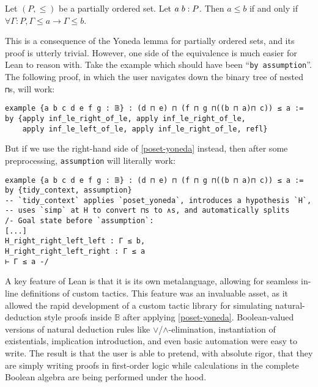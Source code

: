 \documentclass[a4paper,USenglish,cleveref, autoref]{lipics-v2019}
\newcommand{\B}{\mathbb{B}}
\newcommand{\lil}{\lstinline}
\theoremstyle{theorem}
\theoremstyle{definition}
\begin{document}
\begin{lemma}\label{poset-yoneda}
  Let $(P, \leq)$ be a partially ordered set. Let $a \hspace{1mm} b : P$. Then $a \leq b$ if and only if $\forall \Gamma : P, \Gamma \leq a \to \Gamma \leq b$.
\end{lemma}
This is a consequence of the Yoneda lemma for partially ordered sets, and its proof is utterly trivial. However, one side of the equivalence is much easier for Lean to reason with. Take the example which should have been ``\lil{by assumption}''. The following proof, in which the user navigates down the binary tree of nested \lil{⊓}s, will work:
\begin{lstlisting}
example {a b c d e f g : 𝔹} : (d ⊓ e) ⊓ (f ⊓ g ⊓((b ⊓ a)⊓ c)) ≤ a :=
by {apply inf_le_right_of_le, apply inf_le_right_of_le,
    apply inf_le_left_of_le, apply inf_le_right_of_le, refl}
\end{lstlisting}

But if we use the right-hand side of \autoref{poset-yoneda} instead, then after some preprocessing, \lstinline{assumption} will literally work:

\begin{lstlisting}
example {a b c d e f g : 𝔹} : (d ⊓ e) ⊓ (f ⊓ g ⊓((b ⊓ a)⊓ c)) ≤ a :=
by {tidy_context, assumption}
-- `tidy_context` applies `poset_yoneda`, introduces a hypothesis `H`,
-- uses `simp` at H to convert ⊓s to ∧s, and automatically splits
/- Goal state before `assumption`:
[...]
H_right_right_left_left : Γ ≤ b,
H_right_right_left_right : Γ ≤ a
⊢ Γ ≤ a -/
\end{lstlisting}

A key feature of Lean is that it is its own metalanguage, allowing for seamless in-line definitions of custom tactics. This feature was an invaluable asset, as it allowed the rapid development of a custom tactic library for simulating natural-deduction style proofs inside $\B$ after applying \autoref{poset-yoneda}. Boolean-valued versions of natural deduction rules like $\lor$/$\land$-elimination, instantiation of existentials, implication introduction, and even basic automation were easy to write. The result is that the user is able to pretend, with absolute rigor, that they are simply writing proofs in first-order logic while calculations in the complete Boolean algebra are being performed under the hood.
\end{document}
